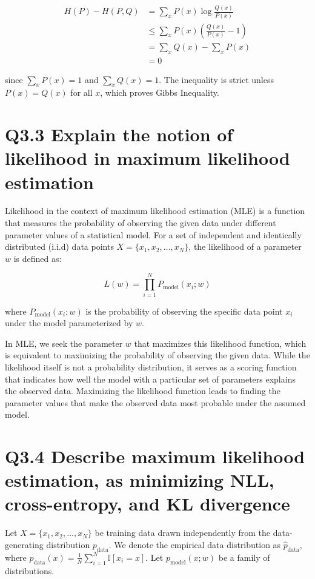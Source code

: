 \documentclass[11pt]{article}
\begin{document}
\begin{align*}
H(P) - H(P,Q) &= \sum_x P(x) \log \frac{Q(x)}{P(x)} \\
&\leq \sum_x P(x) \left( \frac{Q(x)}{P(x)} - 1 \right) \\
&= \sum_x Q(x) - \sum_x P(x) \\
&= 0
\end{align*}

since \( \sum_x P(x) = 1 \) and \( \sum_x Q(x) = 1 \). The inequality is strict unless \( P(x) = Q(x) \) for all \( x \), which proves Gibbs Inequality.


\section{Q3.3 Explain the notion of likelihood in maximum likelihood estimation}

Likelihood in the context of maximum likelihood estimation (MLE) is a function that measures the probability of observing the given data under different parameter values of a statistical model. For a set of independent and identically distributed (i.i.d) data points \( X = \{x_1, x_2, \ldots, x_N\} \), the likelihood of a parameter \( w \) is defined as:

\[
L(w) = \prod_{i=1}^{N} P_{\text{model}}(x_i; w)
\]

where \( P_{\text{model}}(x_i; w) \) is the probability of observing the specific data point \( x_i \) under the model parameterized by \( w \).

In MLE, we seek the parameter \( w \) that maximizes this likelihood function, which is equivalent to maximizing the probability of observing the given data. While the likelihood itself is not a probability distribution, it serves as a scoring function that indicates how well the model with a particular set of parameters explains the observed data. Maximizing the likelihood function leads to finding the parameter values that make the observed data most probable under the assumed model.


\section{Q3.4 Describe maximum likelihood estimation, as minimizing NLL, cross-entropy, and KL divergence}

Let \( X = \{x_1, x_2, \ldots, x_N\} \) be training data drawn independently from the data-generating distribution \( p_{\text{data}} \). We denote the empirical data distribution as \( \hat{p}_{\text{data}} \), where \( \hat{p}_{\text{data}}(x) = \frac{1}{N} \sum_{i=1}^{N} \mathbb{I}[x_i = x] \). Let \( p_{\text{model}}(x; w) \) be a family of distributions.
\end{document}
